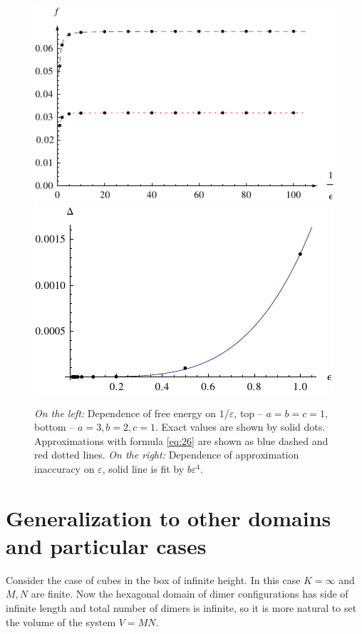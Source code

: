 \documentclass{article}
\begin{document}
\begin{figure}[htbp]
  \includegraphics[scale=0.9]{exact-vs-approximation}
  \includegraphics{error-1}
  \caption{\label{fig:approx-acc} {\it On the left:} Dependence of free energy on $1/\varepsilon$,
    top -- $a=b=c=1$, bottom -- $a=3, b=2, c=1$. Exact values are shown by solid dots.
    Approximations with formula \eqref{eq:26} are shown as blue dashed and red dotted lines. {\it On
      the right:} Dependence of approximation inaccuracy on $\varepsilon$, solid line is fit by $b\varepsilon^{4}$.}
\end{figure}

\section{Generalization to other domains and particular cases}
\label{sec:gener-other-doma}

Consider the case of cubes in the box of infinite height. In this case $K=\infty$ and $M,N$ are
finite. Now the hexagonal domain of dimer configurations has side of infinite length and total
number of dimers is infinite, so it is more natural to set the volume of the system $V=MN$.  
\end{document}
